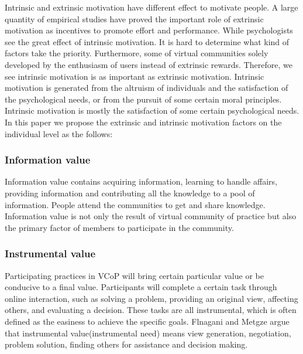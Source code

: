 \documentclass{elsarticle}
\begin{document}
Intrinsic and extrinsic motivation have different effect to motivate people\cite{deci1985ima}. A large quantity of empirical studies have proved the important role
of extrinsic motivation as incentives to promote effort and
performance\cite{gibbons1998io}\cite{388530120001201}. While
psychologists see the great effect of intrinsic
motivation\cite{bul-125-6-62719991101}\cite{wilson1981aas}. It is hard
to determine what kind of  factors
take the priority. Furthermore, some of virtual communities solely 
developed by the enthusiasm of users instead of extrinsic
rewards. Therefore, we see intrinsic motivation is as important as extrinsic
motivation. Intrinsic motivation is generated from the altruism of
individuals and the satisfaction of the psychological needs, or from
the pursuit of some certain moral principles. Intrinsic motivation is
mostly the satisfaction of some certain psychological
needs\cite{josh_lerner_simple_2002}. In this paper we propose 
the extrinsic and intrinsic 
motivation factors on the individual level  as the
follows: 


\subsubsection{ Information value}

Information value contains acquiring
  information, learning to handle affairs, providing information and
  contributing all the knowledge to a pool of
  information\cite{flanagin2001internet}. People attend the
  communities to get and share knowledge\cite{Dholakia2004241}. Information value is not only the result of
  virtual community of practice but also the primary factor of members
  to participate in the community. 

  \subsubsection{Instrumental value}
\label{sec:instrumental-value}
  
Participating practices in VCoP will bring certain particular value or
be conducive to a final value\cite{Roennow-Rasmussen2002}. 
Participants will complete a certain task through
online interaction, such as solving a problem, providing an original
view, affecting others, and evaluating a decision. These tasks are all
instrumental, which is often defined as the easiness to achieve the
specific goals. Flnagani and Metgze argue that instrumental
value(instrumental need) means view generation, negotiation, problem
solution, finding others for assistance and decision making\cite{flanagin2001internet}.
\end{document}
